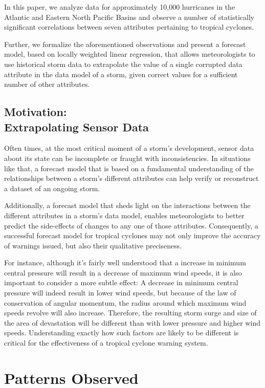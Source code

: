 \documentclass[letterpaper,twocolumn,10pt]{article}
\begin{document}
In this paper, we analyze data for approximately 10,000 hurricanes in the
Atlantic and Eastern North Pacific Basins and observe a number of statistically
significant correlations between seven attributes pertaining to tropical
cyclones.

Further, we formalize the aforementioned observations and present a forecast
model, based on locally weighted linear regression, that allows meteorologists
to use historical storm data to extrapolate the value of a single corrupted data
attribute in the data model of a storm, given correct values for a sufficient
number of other attributes.

\subsection{Motivation:\\Extrapolating Sensor Data}
Often times, at the most critical moment of a storm's development, sensor data
about its state can be incomplete or fraught with inconsistencies. In situations
like that, a forecast model that is based on a fundamental understanding of the
relationships between a storm's different attributes can help verify or 
reconstruct a dataset of an ongoing storm.

Additionally, a forecast model that sheds light on the interactions between
the different attributes in a storm's data model, enables meteorologists to
better predict the side-effects of changes to any one of those attributes.
Consequently, a successful forecast model for tropical cyclones may not only
improve the accuracy of warnings issued, but also their qualitative preciseness.

For instance, although it's fairly well understood that a increase in minimum
central pressure will result in a decrease of maximum wind speeds, it is also
important to consider a more subtle effect: A decrease in minimum central
pressure will indeed result in lower wind speeds, but because of the law of
conservation of angular momentum, the radius around which maximum wind speeds
revolve will also increase. Therefore, the resulting storm surge and size of the
area of devastation will be different than with lower pressure and higher wind
speeds. Understanding exactly how such factors are likely to be different is
critical for the effectiveness of a tropical cyclone warning system.


\section{Patterns Observed}
\end{document}
